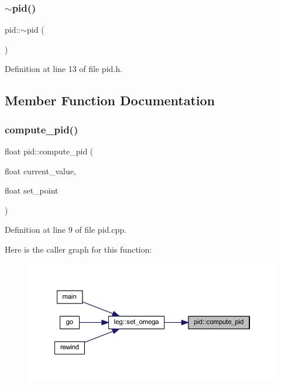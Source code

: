 \mbox{\label{classpid_a39baf63336fc6012bd640a6a8d0c5d6a}} 
\subsubsection{\texorpdfstring{$\sim$pid()}{~pid()}}
{\footnotesize\ttfamily pid\+::$\sim$pid (\begin{DoxyParamCaption}{ }\end{DoxyParamCaption})\hspace{0.3cm}{\ttfamily [inline]}}



Definition at line 13 of file pid.\+h.



\subsection{Member Function Documentation}
\mbox{\label{classpid_a59fcf15bc84320b81a0641e806e9f435}} 
\subsubsection{\texorpdfstring{compute\_pid()}{compute\_pid()}}
{\footnotesize\ttfamily float pid\+::compute\+\_\+pid (\begin{DoxyParamCaption}\item[{float}]{current\+\_\+value,  }\item[{float}]{set\+\_\+point }\end{DoxyParamCaption})}



Definition at line 9 of file pid.\+cpp.

Here is the caller graph for this function\+:
\nopagebreak
\begin{figure}[H]
\begin{center}
\leavevmode
\includegraphics[width=350pt]{classpid_a59fcf15bc84320b81a0641e806e9f435_icgraph}
\end{center}
\end{figure}
\mbox{\label{classpid_af7488e0c71d01d1811d79ccc14d88bbf}} 
